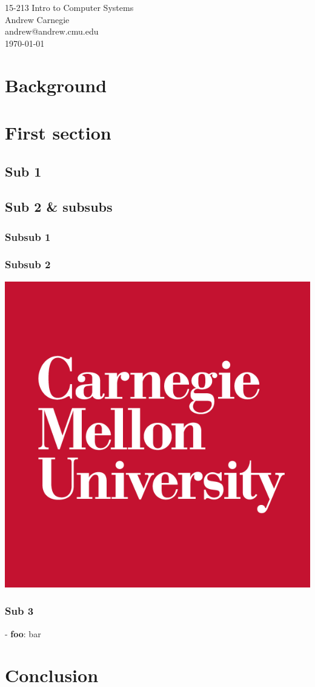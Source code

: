 \documentclass[10pt]{article}
\makeatletter
\newcommand{\myclass}{15-213}
\newcommand{\myname}{Andrew Carnegie}
\newcommand{\myandrew}{andrew@andrew.cmu.edu}
\newcommand{\myhwname}{Intro to Computer Systems}
\makeatother
\begin{document}
\begin{center}
  {\Large \myclass{} \myhwname} \\
  \myname \\
  \myandrew \\
  \today
\end{center}

\section{Background}

\section{First section}

\subsection{Sub 1}

\subsection{Sub 2 \& subsubs}

\subsubsection{Subsub 1}
\subsubsection{Subsub 2}
\begin{center}
  \includegraphics[scale=0.2]{cmu}
\end{center}

\subsubsection{Sub 3}
- \textbf{foo}: bar\\

\section{Conclusion}

\end{document}
